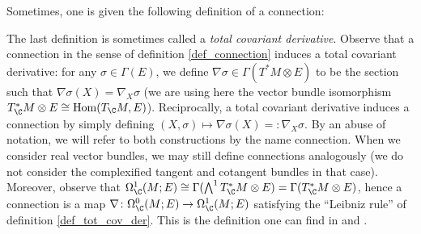 Sometimes, one is given the following definition of a connection:


The last definition is sometimes called a \textit{total covariant derivative}. Observe that a connection in the sense of definition \ref{def_connection} induces a total covariant derivative: for any \(\sigma \in \Gamma(E)\), we define \(\nabla \sigma \in \Gamma(T^*M \otimes E)\) to be the section such that \(\nabla\sigma(X)=\nabla_X \sigma\) (we are using here the vector bundle isomorphism \(T^*_\C M \otimes E \cong \mathrm{Hom}(T_\C M , E)\)). Reciprocally, a total covariant derivative induces a connection by simply defining \((X, \sigma) \mapsto \nabla\sigma (X)=:\nabla_X \sigma\). By an abuse of notation, we will refer to both constructions by the name connection. When we consider real vector bundles, we may still define connections analogously (we do not consider the complexified tangent and cotangent bundles in that case). Moreover, observe that \(\Omega_\C^1(M;E) \cong \Gamma(\bigwedge ^1T^*_\C M \otimes E)=\Gamma(T^*_\C M \otimes E)\), hence a connection is a map \(\nabla \colon \Omega_\C^0(M;E) \to \Omega_\C^1(M;E)\) satisfying the ``Leibniz rule'' of definition \ref{def_tot_cov_der}. This is the definition one can find in \parencite{huybrechts2005complex} and \parencite{kobayashi_complex_vector_bundles}.

